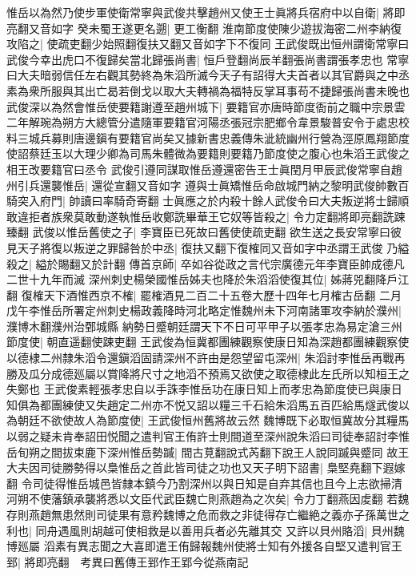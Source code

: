 惟岳以為然乃使步軍使衛常寧與武俊共擊趙州又使王士眞將兵宿府中以自衛|{
	將即亮翻又音如字}
癸未蜀王遂更名遡|{
	更工衡翻}
淮南節度使陳少遊拔海密二州李納復攻陷之|{
	使疏吏翻少始照翻復扶又翻又音如字下不復同}
王武俊既出恒州謂衛常寧曰武俊今幸出虎口不復歸矣當北歸張尚書|{
	恒戶登翻尚辰羊翻張尚書謂張孝忠也}
常寧曰大夫暗弱信任左右觀其勢終為朱滔所滅今天子有詔得大夫首者以其官爵與之中丞素為衆所服與其出亡曷若倒戈以取大夫轉禍為福特反掌耳事苟不捷歸張尚書未晚也武俊深以為然會惟岳使要籍謝遵至趙州城下|{
	要籍官亦唐時節度衙前之職中宗景雲二年解琬為朔方大總管分遣隨軍要籍官河陽丞張冠宗肥鄉令韋景駿普安令于處忠校料三城兵募則唐邊鎭有要籍官尚矣又據新書忠義傳朱泚統幽州行營為涇原鳳翔節度使詔蔡廷玉以大理少卿為司馬朱體微為要籍則要籍乃節度使之腹心也朱滔王武俊之相王改要籍官曰丞令}
武俊引遵同謀取惟岳遵還密告王士眞閏月甲辰武俊常寧自趙州引兵還襲惟岳|{
	還從宣翻又音如字}
遵與士眞矯惟岳命啟城門納之黎明武俊帥數百騎突入府門|{
	帥讀曰率騎奇寄翻}
士眞應之於内殺十餘人武俊令曰大夫叛逆將士歸順敢違拒者族衆莫敢動遂執惟岳收鄭詵畢華王它奴等皆殺之|{
	令力定翻將即亮翻詵踈臻翻}
武俊以惟岳舊使之子|{
	李寶臣已死故曰舊使使疏吏翻}
欲生送之長安常寧曰彼見天子將復以叛逆之罪歸咎於中丞|{
	復扶又翻下復榷同又音如字中丞謂王武俊}
乃縊殺之|{
	縊於賜翻又於計翻}
傳首京師|{
	卒如谷從政之言代宗廣德元年李寶臣帥成德凡二世十九年而滅}
深州刺史楊榮國惟岳姊夫也降於朱滔滔使復其位|{
	姊蔣兕翻降戶江翻}
復榷天下酒惟西京不榷|{
	罷榷酒見二百二十五卷大歷十四年七月榷古岳翻}
二月戊午李惟岳所署定州刺史楊政義降時河北略定惟魏州未下河南諸軍攻李納於濮州|{
	濮博木翻濮州治鄄城縣}
納勢日蹙朝廷謂天下不日可平甲子以張孝忠為易定滄三州節度使|{
	朝直遥翻使踈吏翻}
王武俊為恒冀都團練觀察使康日知為深趙都團練觀察使以德棣二州隸朱滔令還鎭滔固請深州不許由是怨望留屯深州|{
	朱滔討李惟岳再戰再勝及瓜分成德廵屬以賞降將尺寸之地滔不預焉又欲使之取德棣此左氏所以知桓王之失鄭也}
王武俊素輕張孝忠自以手誅李惟岳功在康日知上而孝忠為節度使已與康日知俱為都團練使又失趙定二州亦不悦又詔以糧三千石給朱滔馬五百匹給馬燧武俊以為朝廷不欲使故人為節度使|{
	王武俊恒州舊將故云然}
魏博既下必取恒冀故分其糧馬以弱之疑未肯奉詔田悦聞之遣判官王侑許士則間道至深州說朱滔曰司徒奉詔討李惟岳旬朔之間拔束鹿下深州惟岳勢䠞|{
	間古莧翻說式芮翻下說王人說同䠞與蹙同}
故王大夫因司徒勝勢得以梟惟岳之首此皆司徒之功也又天子明下詔書|{
	梟堅堯翻下遐嫁翻}
令司徒得惟岳城邑皆隸本鎮今乃割深州以與日知是自弃其信也且今上志欲掃清河朔不使藩鎮承襲將悉以文臣代武臣魏亡則燕趙為之次矣|{
	令力丁翻燕因䖍翻}
若魏存則燕趙無患然則司徒果有意矜魏博之危而救之非徒得存亡繼絶之義亦子孫萬世之利也|{
	同舟遇風則胡越可使相救是以善用兵者必先離其交}
又許以貝州賂滔|{
	貝州魏博廵屬}
滔素有異志聞之大喜即遣王侑歸報魏州使將士知有外援各自堅又遣判官王郅|{
	將即亮翻　考異曰舊傳王郅作王郢今從燕南記}
